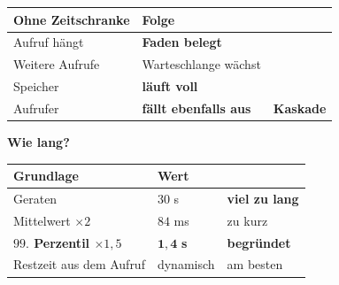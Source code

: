 \begin{merksatz}
\begin{center}
{\small
\renewcommand{\arraystretch}{1.5}
\begin{tabular}{@{}P{3.0cm}P{2.2cm}P{2.6cm}@{}}
\toprule
\textbf{Ohne Zeitschranke} & \textbf{Folge} & \\
\midrule
Aufruf hängt & \textbf{Faden belegt} & \\
Weitere Aufrufe & \textcolor{akzent}{Warte\-schlange wächst} & \\
Speicher & \textcolor{akzent}{\textbf{läuft voll}} & \\
Aufrufer & \textcolor{akzent}{\textbf{fällt ebenfalls aus}} & \textcolor{akzent}{\textbf{Kaskade}}\\
\bottomrule
\end{tabular}}
\end{center}

\begin{center}
\begin{minipage}{0.88\textwidth}
\end{minipage}
\end{center}

\textbf{Wie lang?}

\begin{center}
\renewcommand{\arraystretch}{1.45}
\begin{tabular}{@{}P{2.8cm}P{2.2cm}P{2.6cm}@{}}
\toprule
\textbf{Grundlage} & \textbf{Wert} & \\
\midrule
Geraten & \textcolor{akzent}{$30$ s} & \textcolor{akzent}{\textbf{viel zu lang}}\\
Mittelwert $\times2$ & $84$ ms & \textcolor{akzent}{zu kurz}\\
\textbf{$99.$ Perzentil $\times1{,}5$} & $\mathbf{1{,}4}$ \textbf{s} & \textcolor{gruen}{\textbf{begründet}}\\
Restzeit aus dem Aufruf & \textcolor{gruen}{dynamisch} & \textcolor{gruen}{am besten}\\
\bottomrule
\end{tabular}
\end{center}

\begin{center}
\end{center}


\end{merksatz}
